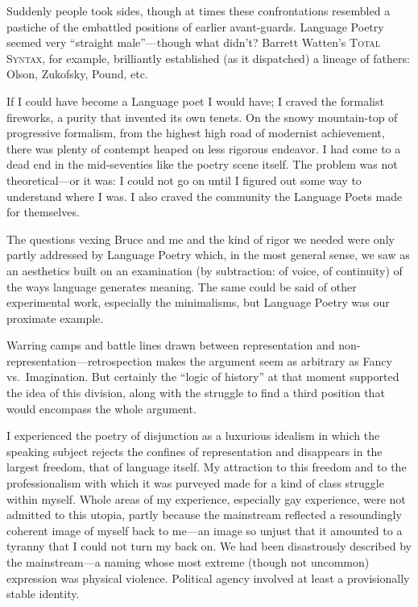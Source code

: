 \documentclass[
]{memoir}
\begin{document}
Suddenly people took sides, though at times these confrontations
resembled a pastiche of the embattled positions of earlier avant-guards.
Language Poetry seemed very ``straight male''---though what didn't?
Barrett Watten's \textsc{Total Syntax}, for example, brilliantly
established (as it dispatched) a lineage of fathers: Olson, Zukofsky,
Pound, etc.

If I could have become a Language poet I would have; I craved the
formalist fireworks, a purity that invented its own tenets. On the snowy
mountain-top of progressive formalism, from the highest high road of
modernist achievement, there was plenty of contempt heaped on less
rigorous endeavor. I had come to a dead end in the mid-seventies like
the poetry scene itself. The problem was not theoretical---or it was: I
could not go on until I figured out some way to understand where I was.
I also craved the community the Language Poets made for themselves.

The questions vexing Bruce and me and the kind of rigor we needed were
only partly addressed by Language Poetry which, in the most general
sense, we saw as an aesthetics built on an examination (by subtraction:
of voice, of continuity) of the ways language generates meaning. The
same could be said of other experimental work, especially the
minimalisms, but Language Poetry was our proximate example.

Warring camps and battle lines drawn between representation and
non-representation---retrospection makes the argument seem as arbitrary
as Fancy vs.~Imagination. But certainly the ``logic of history'' at that
moment supported the idea of this division, along with the struggle to
find a third position that would encompass the whole argument.

I experienced the poetry of disjunction as a luxurious idealism in which
the speaking subject rejects the confines of representation and
disappears in the largest freedom, that of language itself. My
attraction to this freedom and to the professionalism with which it was
purveyed made for a kind of class struggle within myself. Whole areas of
my experience, especially gay experience, were not admitted to this
utopia, partly because the mainstream reflected a resoundingly coherent
image of myself back to me---an image so unjust that it amounted to a
tyranny that I could not turn my back on. We had been disastrously
described by the mainstream---a naming whose most extreme (though not
uncommon) expression was physical violence. Political agency involved at
least a provisionally stable identity.
\end{document}
